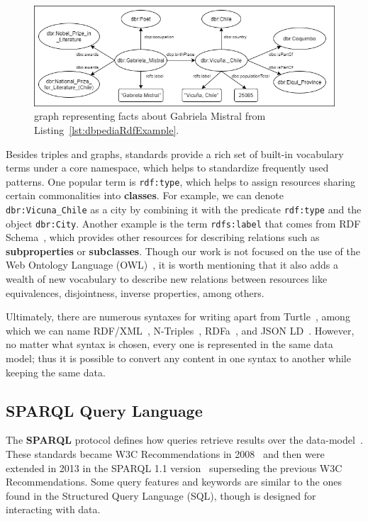 \begin{figure}[!h]
    \centering
    \includegraphics[scale=.55]{imagenes/2_theorical_framework/exampleDbpediaGraph.png}
    \caption{\RDF{} graph representing facts about Gabriela Mistral from Listing~\ref{lst:dbpediaRdfExample}.}
    \label{fig:dbpediaGraphExample}
\end{figure}

Besides \RDF{} triples and \RDF{} graphs, \RDF{} standards provide a rich set of built-in 
vocabulary terms under a core \RDF{} namespace, which helps to standardize frequently used 
\RDF{} patterns. One popular term is \texttt{rdf:type}, which helps to assign resources 
sharing certain commonalities into \textbf{classes}. For example, we can denote 
\texttt{dbr:Vicuna\_Chile} as a city by combining it with the predicate \texttt{rdf:type} 
and the object \texttt{dbr:City}. Another example is the term \texttt{rdfs:label} that 
comes from RDF Schema~\cite{key:rdfsold}, which provides other resources for describing 
relations such as \textbf{subproperties} or \textbf{subclasses}. Though our work is not 
focused on the use of the Web Ontology Language (OWL)~\cite{key:owl2rationale, key:owloverview}, 
it is worth mentioning that it also adds a wealth of new vocabulary to describe new 
relations between resources like equivalences, disjointness, inverse properties, among others.

Ultimately, there are numerous syntaxes for writing \RDF{} apart from Turtle~\cite{key:turtle}, among 
which we can name RDF/XML~\cite{key:rdfxml}, N-Triples~\cite{key:testcases}, RDFa~\cite{key:rdfa11p, key:rdfa}, 
and JSON LD~\cite{key:jsonld}. However, no matter what syntax is chosen, every one is 
represented in the same \RDF{} data model; thus it is possible to convert any \RDF{} content 
in one syntax to another while keeping the same \RDF{} data.

\subsection{SPARQL Query Language}
\label{cap2:semWeb/sparql}
The \textbf{SPARQL} protocol defines how \SPARQL{} queries retrieve results over the \RDF{} 
data-model~\cite{key:sparql11protocol}. These standards became W3C Recommendations in 
2008~\cite{key:sparql} and then were extended in 2013 in the SPARQL 1.1 version~\cite{key:sparql11} 
superseding the previous W3C Recommendations. Some \SPARQL{} query features and keywords are similar 
to the ones found in the Structured Query Language (SQL), though \SPARQL{} is designed for interacting 
with \RDF{} data.


